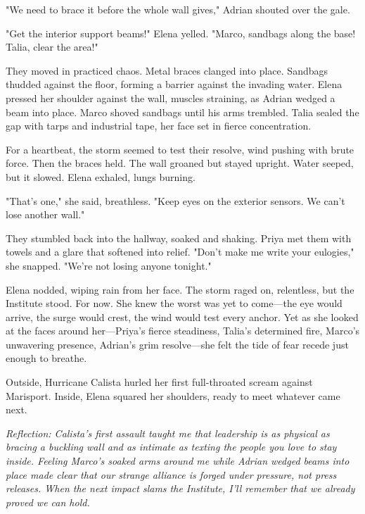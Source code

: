 "We need to brace it before the whole wall gives," Adrian shouted over the gale.

"Get the interior support beams!" Elena yelled. "Marco, sandbags along the base! Talia, clear the area!"

They moved in practiced chaos. Metal braces clanged into place. Sandbags thudded against the floor, forming a barrier against the invading water. Elena pressed her shoulder against the wall, muscles straining, as Adrian wedged a beam into place. Marco shoved sandbags until his arms trembled. Talia sealed the gap with tarps and industrial tape, her face set in fierce concentration.

For a heartbeat, the storm seemed to test their resolve, wind pushing with brute force. Then the braces held. The wall groaned but stayed upright. Water seeped, but it slowed. Elena exhaled, lungs burning.

"That's one," she said, breathless. "Keep eyes on the exterior sensors. We can't lose another wall."

They stumbled back into the hallway, soaked and shaking. Priya met them with towels and a glare that softened into relief. "Don't make me write your eulogies," she snapped. "We're not losing anyone tonight."

Elena nodded, wiping rain from her face. The storm raged on, relentless, but the Institute stood. For now. She knew the worst was yet to come—the eye would arrive, the surge would crest, the wind would test every anchor. Yet as she looked at the faces around her—Priya's fierce steadiness, Talia's determined fire, Marco's unwavering presence, Adrian's grim resolve—she felt the tide of fear recede just enough to breathe.

Outside, Hurricane Calista hurled her first full-throated scream against Marisport. Inside, Elena squared her shoulders, ready to meet whatever came next.

\noindent\textit{Reflection: Calista's first assault taught me that leadership is as physical as bracing a buckling wall and as intimate as texting the people you love to stay inside. Feeling Marco's soaked arms around me while Adrian wedged beams into place made clear that our strange alliance is forged under pressure, not press releases. When the next impact slams the Institute, I'll remember that we already proved we can hold.}

